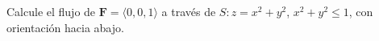 Calcule el flujo de $\mathbf F=\langle0,0,1\rangle$ a través de $S:z=x^2+y^2$, $x^2+y^2\leq1$, con orientación hacia abajo.
